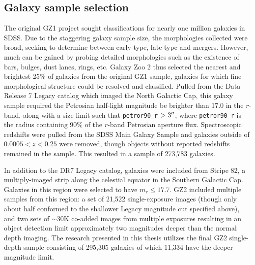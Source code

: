 \subsection{Galaxy sample selection}

The original GZ1 project sought classifications for nearly one million galaxies in SDSS. Due to the staggering galaxy sample size, the morphologies collected were broad, seeking to determine between early-type, late-type and mergers. However, much can be gained by probing detailed morphologies such as the existence of bars, bulges, dust lanes, rings, etc. Galaxy Zoo 2 thus selected the nearest and brightest 25\% of galaxies from the original GZ1 sample, galaxies for which fine morphological structure could be resolved and classified. Pulled from the Data Release 7 Legacy catalog \citep{Abazajian2009} which imaged the North Galactic Cap, this galaxy sample required the Petrosian half-light magnitude be brighter than 17.0 in the $r$-band, along with a size limit such that \texttt{petror90\_r} $>3\mbox{$^{\prime\prime}$}$, where \texttt{petror90\_r} is the radius containing 90\% of the $r$-band Petrosian aperture flux. Spectroscopic redshifts were pulled from the SDSS Main Galaxy Sample \citep{Strauss2002} and galaxies outside of $0.0005 < z < 0.25$ were removed, though objects without reported redshifts remained in the sample. This resulted in a sample of 273,783 galaxies. 

In addition to the DR7 Legacy catalog, galaxies were included from Stripe 82, a multiply-imaged strip along the celestial equator in the Southern Galactic Cap. Galaxies in this region were selected to have $m_r\le17.7$. GZ2 included multiple samples from this region: a set of 21,522 single-exposure images (though only about half conformed to the shallower Legacy magnitude cut specified above), and two sets of $\sim$30K co-added images from multiple exposures resulting in an object detection limit approximately two magnitudes deeper than the normal depth imaging. The research presented in this thesis utilizes the final GZ2 single-depth sample consisting of 295,305 galaxies of which 11,334 have the deeper magnitude limit. 


